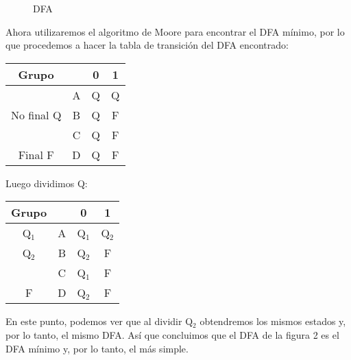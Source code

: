 \documentclass[spanish]{article}
\begin{document}
          \begin{figure}[H]
            \centering
            \caption{DFA}
          \end{figure}
          Ahora utilizaremos el algoritmo de Moore para encontrar el DFA mínimo, por lo que procedemos
          a hacer la tabla de transición del DFA encontrado:\\
          \begin{table}[H]
              \centering
              \begin{tabular}{|c c|c|c|}
                  \hline
                  Grupo & \space & 0 & 1\\
                  \hline
                  \space & A & Q & Q\\
                  No final Q & B & Q & F\\
                  & C & Q & F\\
                  \hline
                  Final F & D & Q & F\\
                  \hline
              \end{tabular}
          \end{table}
          
          Luego dividimos Q:\\
          
          \begin{table}[H]
              \centering
              \begin{tabular}{|c c|c|c|}
                  \hline
                  Grupo & \space & 0 & 1\\
                  \hline
                  Q$_1$ & A & Q$_1$ & Q$_2$\\
                  \hline
                  Q$_2$ & B & Q$_2$ & F\\
                  \space & C & Q$_1$ & F\\
                  \hline
                  F & D & Q$_2$ & F\\
                  \hline
              \end{tabular}
          \end{table}
          
          En este punto, podemos ver que al dividir Q$_2$ obtendremos los mismos estados y, por lo tanto, el mismo DFA.
          Así que concluimos que el DFA de la figura 2 es el DFA mínimo y, por lo tanto, el más simple.
          
\end{document}
